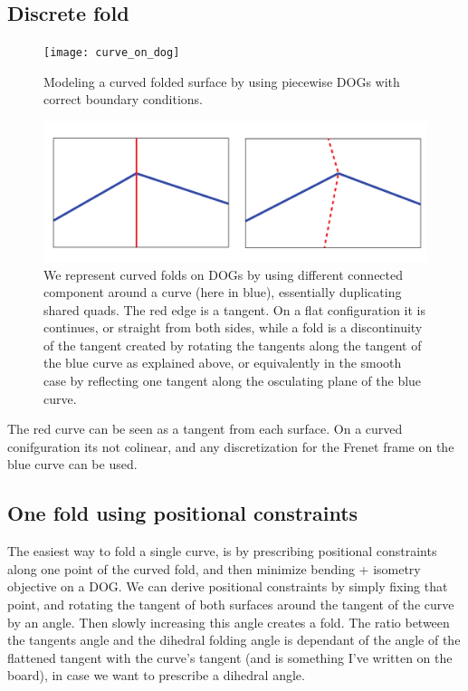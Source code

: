 \documentclass{article}
\theoremstyle{definition}
\begin{document}
\subsection{Discrete fold}

\begin{figure} [h]
	\centering
	\texttt{[image: curve\_on\_dog]}
	\caption{Modeling a curved folded surface by using piecewise DOGs with correct boundary conditions.}
	\label{fig:folding_an_edge.pdf}
\end{figure}


\begin{figure} [h]
	\centering
	\includegraphics[width=\linewidth,height=0.22\linewidth]{folding_an_edge.pdf}
	\caption{We represent curved folds on DOGs by using different connected component around a curve (here in blue), essentially duplicating shared quads. The red edge is a tangent. On a flat configuration it is continues, or straight from both sides, while a fold is a discontinuity of the tangent created by rotating the tangents along the tangent of the blue curve as explained above, or equivalently in the smooth case by reflecting one tangent along the osculating plane of the blue curve.}
	\label{fig:folding_an_edge.pdf}
\end{figure}
The red curve can be seen as a tangent from each surface. On a curved conifguration its not colinear, and any discretization for the Frenet frame on the blue curve can be used.

\subsection{One fold using positional constraints}
The easiest way to fold a single curve, is by prescribing positional constraints along one point  of the curved fold, and then minimize bending + isometry objective on a DOG. We can derive positional constraints by simply fixing that point, and rotating the tangent of both surfaces around the tangent of the curve by an angle. Then slowly increasing this angle creates a fold. The ratio between the tangents angle and the dihedral folding angle is dependant of the angle of the flattened tangent with the curve's tangent (and is something I've written on the board), in case we want to prescribe a dihedral angle.
\end{document}
